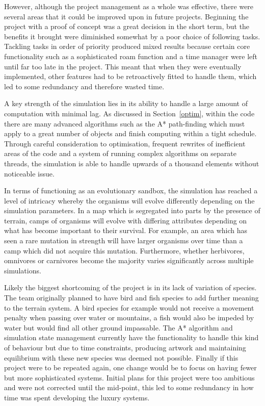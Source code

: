 \documentclass[a4paper, oneside, 11pt]{report}
\begin{document}
However, although the project management as a whole was effective, there were several areas that it could be improved upon in future projects. Beginning the project with a proof of concept was a great decision in the short term, but the benefits it brought were diminished somewhat by a poor choice of following tasks. Tackling tasks in order of priority produced mixed results because certain core functionality such as a sophisticated roam function and a time manager were left until far too late in the project. This meant that when they were eventually implemented, other features had to be retroactively fitted to handle them, which led to some redundancy and therefore wasted time.

A key strength of the simulation lies in its ability to handle a large amount of computation with minimal lag. As discussed in Section~\ref{optim}, within the code there are many advanced algorithms such as the A* path-finding which must apply to a great number of objects and finish computing within a tight schedule. Through careful consideration to optimisation, frequent rewrites of inefficient areas of the code and a system of running complex algorithms on separate threads, the simulation is able to handle upwards of a thousand elements without noticeable issue.

In terms of functioning as an evolutionary sandbox, the simulation has reached a level of intricacy whereby the organisms will evolve differently depending on the simulation parameters. In a map which is segregated into parts by the presence of terrain, camps of organisms will evolve with differing attributes depending on what has become important to their survival. For example, an area which has seen a rare mutation in strength will have larger organisms over time than a camp which did not acquire this mutation. Furthermore, whether herbivores, omnivores or carnivores become the majority varies significantly across multiple simulations.

Likely the biggest shortcoming of the project is in its lack of variation of species. The team originally planned to have bird and fish species to add further meaning to the terrain system. A bird species for example would not receive a movement penalty when passing over water or mountains, a fish would also be impeded by water but would find all other ground impassable. The A* algorithm and simulation state management currently have the functionality to handle this kind of behaviour but due to time constraints, producing artwork and maintaining equilibrium with these new species was deemed not possible.
Finally if this project were to be repeated again, one change would be to focus on having fewer but more sophisticated systems. Initial plans for this project were too ambitious and were not corrected until the mid-point, this led to some redundancy in how time was spent developing the luxury systems.
\end{document}
